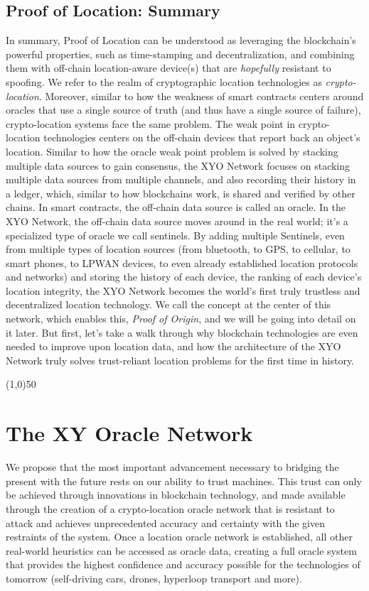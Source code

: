 \documentclass{article}
\begin{document}
\subsection {Proof of Location: Summary}
In summary, Proof of Location can be understood as leveraging the blockchain's powerful properties, such as time-stamping and decentralization, and combining them with off-chain location-aware device(s) that are \textit{hopefully} resistant to spoofing. We refer to the realm of cryptographic location technologies as \textit{crypto-location}. Moreover, similar to how the weakness of smart contracts centers around oracles that use a single source of truth (and thus have a single source of failure), crypto-location systems face the same problem. The weak point in crypto-location technologies centers on the off-chain devices that report back an object's location. Similar to how the oracle weak point problem is solved by stacking multiple data sources to gain consensus, the XYO Network focuses on stacking multiple data sources from multiple channels, and also recording their history in a ledger, which, similar to how blockchains work, is shared and verified by other chains. In smart contracts, the off-chain data source is called an oracle. In the XYO Network, the off-chain data source moves around in the real world; it's a specialized type of oracle we call \Glspl{sentinel}. By adding multiple Sentinels, even from multiple types of location sources (from bluetooth, to GPS, to cellular, to smart phones, to LPWAN devices, to even already established location protocols and networks) and storing the history of each device, the ranking of each device's location integrity, the XYO Network becomes the world's first truly trustless and decentralized location technology. We call the concept at the center of this network, which enables this, \textit{Proof of Origin}, and we will be going into detail on it later. But first, let's take a walk through why blockchain technologies are even needed to improve upon location data, and how the architecture of the XYO Network truly solves trust-reliant location problems for the first time in history.
\begin{center}
\line(1,0){50}
\end{center}



\section {The XY Oracle Network}
We propose that the most important advancement necessary to bridging the present with the future rests on our ability to trust machines. This trust can only be achieved through innovations in blockchain technology, and made available through the creation of a crypto-location \gls{oracle} network that is resistant to attack and achieves unprecedented \gls{accuracy} and \gls{certainty} with the given restraints of the system. Once a location oracle network is established, all other real-world \glspl{heuristic} can be accessed as oracle data, creating a full oracle system that provides the highest confidence and accuracy possible for the technologies of tomorrow (self-driving cars, drones, hyperloop transport and more).
\end{document}
